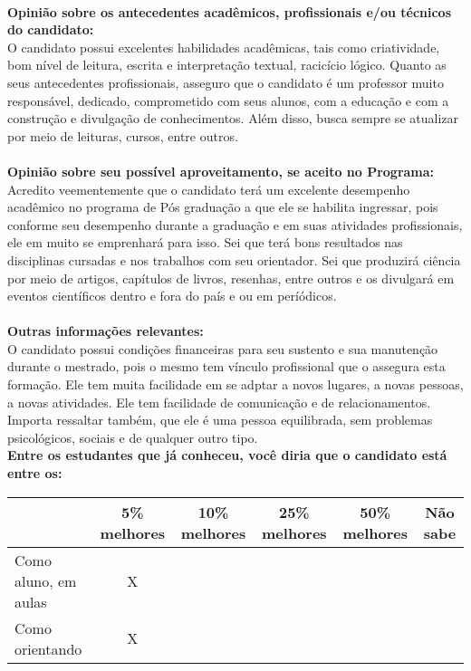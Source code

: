 \documentclass[11pt]{article}
\begin{document}
\\
\textbf{Opinião sobre os antecedentes acadêmicos, profissionais e/ou técnicos do candidato:}
\\O candidato possui excelentes habilidades acadêmicas, tais como criatividade, bom nível de leitura, escrita e interpretação textual, racicício lógico.
Quanto as seus antecedentes profissionais, asseguro que o candidato é um professor muito responsável, dedicado, comprometido com seus alunos, com a educação e com a construção e divulgação de conhecimentos. Além disso, busca sempre se atualizar por meio de leituras, cursos, entre outros.\\
\\
\textbf{Opinião sobre seu possível aproveitamento, se aceito no Programa:}
\\Acredito veementemente que o candidato terá um excelente desempenho acadêmico no programa de Pós graduação a que ele se habilita ingressar, pois conforme seu desempenho durante a graduação e em suas atividades profissionais, ele em muito se emprenhará para isso.
Sei que terá bons resultados nas disciplinas cursadas e nos trabalhos com seu orientador. Sei que produzirá ciência por meio de artigos, capítulos de livros, resenhas, entre outros e os divulgará em eventos científicos dentro e fora do país e ou em períódicos.\\ 
\\
\textbf{Outras informações relevantes:} \\O candidato possui condições financeiras para seu sustento e sua manutenção durante o mestrado, pois o mesmo tem vínculo profissional que o assegura esta formação. Ele tem muita facilidade em se adptar a novos lugares, a novas pessoas, a novas atividades. Ele tem facilidade de comunicação e de relacionamentos.
Importa ressaltar também, que ele é uma pessoa equilibrada, sem problemas psicológicos, sociais e de qualquer outro tipo.
\\[0.3cm]
\textbf{Entre os estudantes que já conheceu, você diria que o candidato está entre os:}
\\
\begin{tabular}{|l|c|c|c|c|c|}
\hline
 & 5\% melhores & 10\% melhores & 25\% melhores & 50\% melhores & Não sabe \\
\hline
Como aluno, em aulas & X &  &  &  & \\
\hline
Como orientando & X &  &  &  & \\
\hline
\end{tabular}
\end{document}
